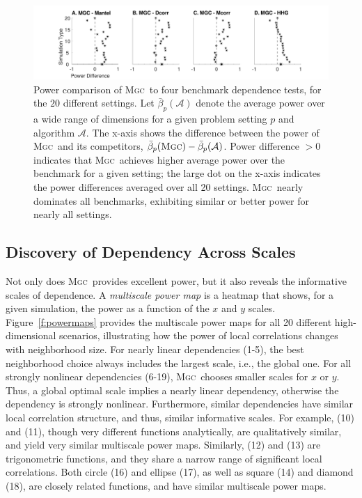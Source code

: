 \documentclass[11pt]{article}
\providecommand{\sct}[1]{{\normalfont\textsc{#1}}}
\providecommand{\mc}[1]{\mathcal{#1}}
\newcommand{\Mgc}{\sct{Mgc}}
\begin{document}
\begin{figure}
  \centering
  \includegraphics[width=1.0\textwidth,trim={3.5cm 0 3.5cm 0},clip]{Figures/FigHDPowerMGCM}
  \caption{Power comparison of  \Mgc~to four benchmark dependence tests, for the $20$ different settings.  
Let $\bar{\beta}_p(\mathcal{A})$ denote the average power over a wide range of dimensions for a given problem setting $p$ and algorithm $\mc{A}$. The x-axis shows the difference between the power of \Mgc~and its competitors,  $\bar{\beta}_p(\Mgc)-\bar{\beta}_p(\mathcal{A})$. Power difference $>0$ indicates that \Mgc~achieves higher average power over the benchmark for a given setting;
the large dot on the x-axis indicates the  power differences averaged over all 20 settings.
\Mgc~nearly dominates all benchmarks, exhibiting similar or better power for nearly all settings. 
}
\label{f:nDSummary}
\end{figure}


\subsection*{Discovery of Dependency Across Scales}
\label{main3}

Not only does \Mgc~provides excellent power, but it also reveals the informative scales of dependence. 
A \emph{multiscale power map} is a heatmap that shows, for a given simulation, the power as a function of the $x$ and $y$ scales.  
Figure~\ref{f:powermaps} provides the multiscale power maps for all 20 different high-dimensional scenarios, illustrating how the power of local correlations changes with  neighborhood size.
For nearly linear dependencies (1-5), the best neighborhood choice always includes the largest scale, i.e., the global one. For all strongly nonlinear dependencies (6-19),  \Mgc~chooses smaller scales for $x$ or $y$. Thus, a global optimal scale implies a nearly linear dependency, otherwise the dependency is strongly nonlinear.
Furthermore, similar dependencies have similar local correlation structure, and thus, similar informative scales. For example, (10) and (11), though very different functions analytically, are qualitatively similar, and yield very similar multiscale power maps.
Similarly,  (12) and (13) are trigonometric functions, and they share a narrow range of significant local correlations.
Both circle (16) and ellipse (17), as well as square (14) and diamond (18), are closely related functions, and have similar multiscale power maps. 
\end{document}
